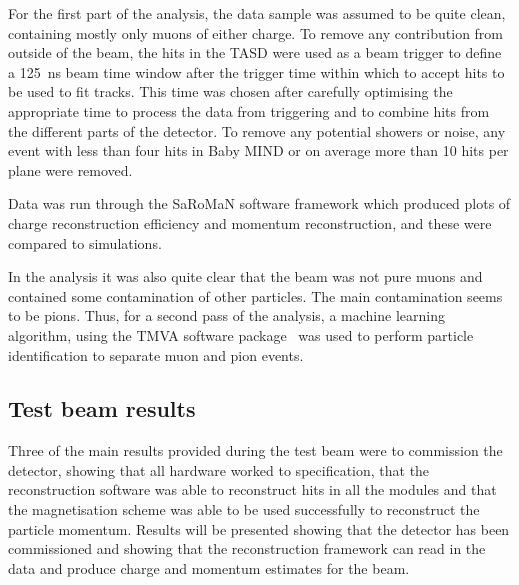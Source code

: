 For the first part of the analysis, the data sample was assumed to be quite clean, containing mostly only muons of either charge. To remove any contribution from outside of the beam, the hits in the TASD were used as a beam trigger to define a 125~ns beam time window after the trigger time within which to accept hits to be used to fit tracks. This time was chosen after carefully optimising the appropriate time to process the data from triggering and to combine hits from the different parts of the detector. To remove any potential showers or noise, any event with less than four hits in Baby MIND or on average more than 10 hits per plane were removed.

Data was run through the SaRoMaN software framework which produced plots of charge reconstruction efficiency and momentum reconstruction, and these were compared to simulations.

In the analysis it was also quite clear that the beam was not pure muons and contained some contamination of other particles. The main contamination seems to be pions. Thus, for a second pass of the analysis, a machine learning algorithm, using the TMVA software package~\cite{TMVA} was used to perform particle identification to separate muon and pion events.









\subsection{Test beam results}
Three of the main results provided during the test beam were to commission the detector, showing that all hardware worked to specification, that the reconstruction software was able to reconstruct hits in all the modules and that the magnetisation scheme was able to be used successfully to reconstruct the particle momentum. Results will be presented showing that the detector has been commissioned and showing that the reconstruction framework can read in the data and produce charge and momentum estimates for the beam.

